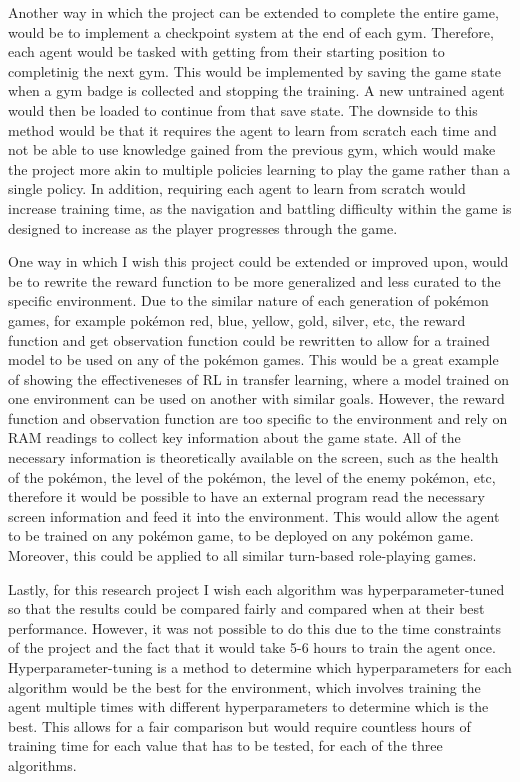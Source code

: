 Another way in which the project can be extended to complete the entire game, would be to implement a checkpoint system at the end of each gym. Therefore, each agent would be tasked with getting from their starting position to completinig the next gym. This would be implemented by saving the game state when a gym badge is collected and stopping the training. A new untrained agent would then be loaded to continue from that save state. The downside to this method would be that it requires the agent to learn from scratch each time and not be able to use knowledge gained from the previous gym, which would make the project more akin to multiple policies learning to play the game rather than a single policy. In addition, requiring each agent to learn from scratch would increase training time, as the navigation and battling difficulty within the game is designed to increase as the player progresses through the game.

One way in which I wish this project could be extended or improved upon, would be to rewrite the reward function to be more generalized and less curated to the specific environment. Due to the similar nature of each generation of pokémon games, for example pokémon red, blue, yellow, gold, silver, etc, the reward function and get observation function could be rewritten to allow for a trained model to be used on any of the pokémon games. This would be a great example of showing the effectiveneses of RL in transfer learning, where a model trained on one environment can be used on another with similar goals. However, the reward function and observation function are too specific to the environment and rely on RAM readings to collect key information about the game state. All of the necessary information is theoretically available on the screen, such as the health of the pokémon, the level of the pokémon, the level of the enemy pokémon, etc, therefore it would be possible to have an external program read the necessary screen information and feed it into the environment. This would allow the agent to be trained on any pokémon game, to be deployed on any pokémon game. Moreover, this could be applied to all similar turn-based role-playing games. 

Lastly, for this research project I wish each algorithm was hyperparameter-tuned so that the results could be compared fairly and compared when at their best performance. However, it was not possible to do this due to the time constraints of the project and the fact that it would take 5-6 hours to train the agent once. Hyperparameter-tuning is a method to determine which hyperparameters for each algorithm would be the best for the environment, which involves training the agent multiple times with different hyperparameters to determine which is the best. This allows for a fair comparison but would require countless hours of training time for each value that has to be tested, for each of the three algorithms. 